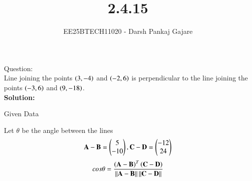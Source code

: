 \documentclass[journal,12pt,onecolumn]{IEEEtran}
\begin{document}
\title{2.4.15}
\author{EE25BTECH11020 - Darsh Pankaj Gajare}
{\let\newpage\relax\maketitle}
Question:\\
Line joining the points $\left(3,-4\right)$ and $\left(-2,6\right)$ is perpendicular to the line joining the points $\left(-3,6\right)$  and $\left(9,-18\right)$.\\
\textbf{Solution:}
\begin{table}[H]
	\centering
	\caption{Given Data}
	
	\label{}
\end{table}
Let $\theta$ be the angle between the lines
\begin{align}
\mathbf{A}-\mathbf{B}=\begin{pmatrix}5\\-10\end{pmatrix}, \mathbf{C}-\mathbf{D}=\begin{pmatrix}-12\\24\end{pmatrix}
\end{align}
\begin{align}
	cos\theta=\frac{\left(\mathbf{A}-\mathbf{B}\right)^T \left(\mathbf{C}-\mathbf{D}\right)}{\left\lVert\mathbf{A}-\mathbf{B}\right\rVert\left\lVert\mathbf{C}-\mathbf{D}\right\rVert}
    \end{align}
\end{document}
